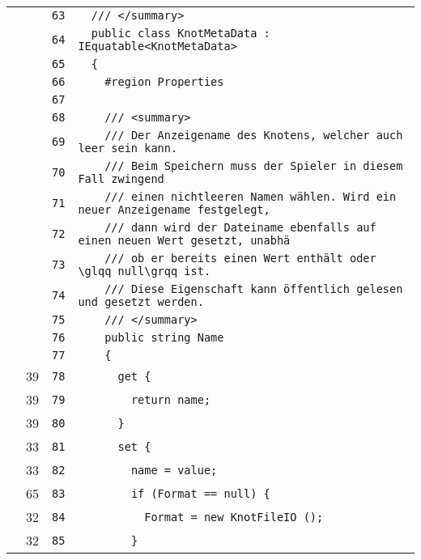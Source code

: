 \documentclass[a4paper,10pt]{article}
\begin{document}
\begin{longtable}[l]{lrrl}
\cellcolor{gray} &  & \verb~63~ & \verb~  /// </summary>~\\
\cellcolor{gray} &  & \verb~64~ & \verb~  public class KnotMetaData : IEquatable<KnotMetaData>~\\
\cellcolor{gray} &  & \verb~65~ & \verb~  {~\\
\cellcolor{gray} &  & \verb~66~ & \verb~    #region Properties~\\
\cellcolor{gray} &  & \verb~67~ & \verb~~\\
\cellcolor{gray} &  & \verb~68~ & \verb~    /// <summary>~\\
\cellcolor{gray} &  & \verb~69~ & \verb~    /// Der Anzeigename des Knotens, welcher auch leer sein kann.~\\
\cellcolor{gray} &  & \verb~70~ & \verb~    /// Beim Speichern muss der Spieler in diesem Fall zwingend~\\
\cellcolor{gray} &  & \verb~71~ & \verb~    /// einen nichtleeren Namen wählen. Wird ein neuer Anzeigename festgelegt,~\\
\cellcolor{gray} &  & \verb~72~ & \verb~    /// dann wird der Dateiname ebenfalls auf einen neuen Wert gesetzt, unabhä~\\
\cellcolor{gray} &  & \verb~73~ & \verb~    /// ob er bereits einen Wert enthält oder \glqq null\grqq ist.~\\
\cellcolor{gray} &  & \verb~74~ & \verb~    /// Diese Eigenschaft kann öffentlich gelesen und gesetzt werden.~\\
\cellcolor{gray} &  & \verb~75~ & \verb~    /// </summary>~\\
\cellcolor{gray} &  & \verb~76~ & \verb~    public string Name~\\
\cellcolor{gray} &  & \verb~77~ & \verb~    {~\\
\cellcolor{green} & 39 & \verb~78~ & \verb~      get {~\\
\cellcolor{green} & 39 & \verb~79~ & \verb~        return name;~\\
\cellcolor{green} & 39 & \verb~80~ & \verb~      }~\\
\cellcolor{green} & 33 & \verb~81~ & \verb~      set {~\\
\cellcolor{green} & 33 & \verb~82~ & \verb~        name = value;~\\
\cellcolor{green} & 65 & \verb~83~ & \verb~        if (Format == null) {~\\
\cellcolor{green} & 32 & \verb~84~ & \verb~          Format = new KnotFileIO ();~\\
\cellcolor{green} & 32 & \verb~85~ & \verb~        }~\\

\end{longtable}
\end{document}
